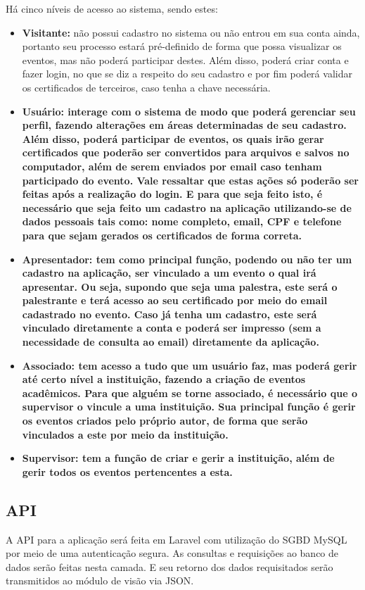 Há cinco níveis de acesso ao sistema, sendo estes:
\begin{itemize}
    \item \textbf{Visitante: } não possui cadastro no sistema ou não entrou em sua conta ainda, portanto seu processo estará pré-definido de forma que possa visualizar os eventos, mas não poderá participar destes. Além disso, poderá criar conta e fazer login, no que se diz a respeito do seu cadastro e por fim poderá validar os certificados de terceiros, caso tenha a chave necessária.
    \item \textbf{Usuário: interage com o sistema de modo que poderá gerenciar seu perfil, fazendo alterações em áreas determinadas de seu cadastro. Além disso, poderá participar de eventos, os quais irão gerar certificados que poderão ser convertidos para arquivos e salvos no computador, além de serem enviados por email caso tenham participado do evento. Vale ressaltar que estas ações só poderão ser feitas após a realização do login. E para que seja feito isto, é necessário que seja feito um cadastro na aplicação utilizando-se de dados pessoais tais como: nome completo, email, CPF e telefone para que sejam gerados os certificados de forma correta. }
    \item \textbf{Apresentador: tem como principal função, podendo ou não ter um cadastro na aplicação, ser vinculado a um evento o qual irá apresentar. Ou seja, supondo que seja uma palestra, este será o palestrante e terá acesso ao seu certificado por meio do email cadastrado no evento. Caso já tenha um cadastro, este será vinculado diretamente a conta e poderá ser impresso (sem a necessidade de consulta ao email) diretamente da aplicação.}
    \item \textbf{Associado: tem acesso a tudo que um usuário faz, mas poderá gerir até certo nível a instituição, fazendo a criação de eventos acadêmicos. Para que alguém se torne associado, é necessário que o supervisor o vincule a uma instituição. Sua principal função é gerir os eventos criados pelo próprio autor, de forma que serão vinculados a este por meio da instituição.}
    \item \textbf{Supervisor: tem a função de criar e gerir a instituição, além de gerir todos os eventos pertencentes a esta.}
\end{itemize}


\subsection{API}
A API para a aplicação será feita em Laravel com utilização do SGBD MySQL por meio de uma autenticação segura. As consultas e requisições ao banco de dados serão feitas nesta camada. E seu retorno dos dados requisitados serão transmitidos ao módulo de visão via JSON.


